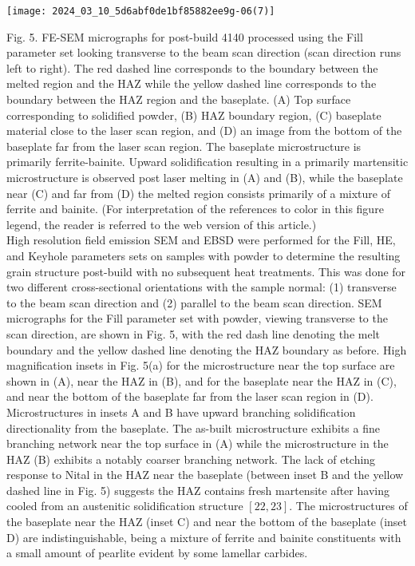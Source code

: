 \documentclass[10pt]{article}
\begin{document}
\begin{center}
\texttt{[image: 2024\_03\_10\_5d6abf0de1bf85882ee9g-06(7)]}
\end{center}

Fig. 5. FE-SEM micrographs for post-build 4140 processed using the Fill parameter set looking transverse to the beam scan direction (scan direction runs left to right). The red dashed line corresponds to the boundary between the melted region and the HAZ while the yellow dashed line corresponds to the boundary between the HAZ region and the baseplate. (A) Top surface corresponding to solidified powder, (B) HAZ boundary region, (C) baseplate material close to the laser scan region, and (D) an image from the bottom of the baseplate far from the laser scan region. The baseplate microstructure is primarily ferrite-bainite. Upward solidification resulting in a primarily martensitic microstructure is observed post laser melting in (A) and (B), while the baseplate near (C) and far from (D) the melted region consists primarily of a mixture of ferrite and bainite. (For interpretation of the references to color in this figure legend, the reader is referred to the web version of this article.)\\
High resolution field emission SEM and EBSD were performed for the Fill, HE, and Keyhole parameters sets on samples with powder to determine the resulting grain structure post-build with no subsequent heat treatments. This was done for two different cross-sectional orientations with the sample normal: (1) transverse to the beam scan direction and (2) parallel to the beam scan direction. SEM micrographs for the Fill parameter set with powder, viewing transverse to the scan direction, are shown in Fig. 5, with the red dash line denoting the melt boundary and the yellow dashed line denoting the HAZ boundary as before. High magnification insets in Fig. 5(a) for the microstructure near the top surface are shown in (A), near the HAZ in (B), and for the baseplate near the HAZ in (C), and near the bottom of the baseplate far from the laser scan region in (D). Microstructures in insets A and B have upward branching solidification directionality from the baseplate. The as-built microstructure exhibits a fine branching network near the top surface in (A) while the microstructure in the HAZ (B) exhibits a notably coarser branching network. The lack of etching response to Nital in the HAZ near the baseplate (between inset B and the yellow dashed line in Fig. 5) suggests the HAZ contains fresh martensite after having cooled from an austenitic solidification structure $[22,23]$. The microstructures of the baseplate near the HAZ (inset C) and near the bottom of the baseplate (inset D) are indistinguishable, being a mixture of ferrite and bainite constituents with a small amount of pearlite evident by some lamellar carbides.
\end{document}
